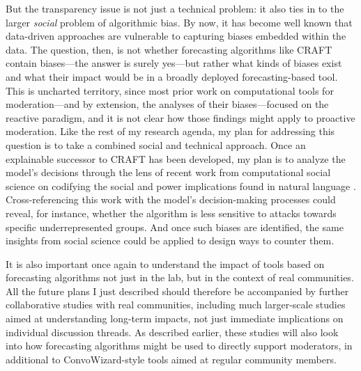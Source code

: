 \documentclass[11pt,letterpaper]{article}
\begin{document}
But the transparency issue is not just a technical problem: it also ties in to the larger \emph{social} problem of algorithmic bias.
By now, it has become well known that data-driven approaches are vulnerable to capturing biases embedded within the data.
The question, then, is not whether forecasting algorithms like CRAFT contain biases---the answer is surely yes---but rather what kinds of biases exist and what their impact would be in a broadly deployed forecasting-based tool.
This is uncharted territory, since most prior work on computational tools for moderation---and by extension, the analyses of their biases---focused on the reactive paradigm, and it is not clear how those findings might apply to proactive moderation.
Like the rest of my research agenda, my plan for addressing this question is to take a combined social and technical approach.
Once an explainable successor to CRAFT has been developed, my plan is to analyze the model's decisions through the lens of recent work from computational social science on codifying the social and power implications found in natural language \cite{sap_social_2020}.
Cross-referencing this work with the model's decision-making processes could reveal, for instance, whether the algorithm is less sensitive to attacks towards specific underrepresented groups.
And once such biases are identified, the same insights from social science could be applied to design ways to counter them.

It is also important once again to understand the impact of tools based on forecasting algorithms not just in the lab, but in the context of real communities.
All the future plans I just described should therefore be accompanied by further collaborative studies with real communities, including much larger-scale studies aimed at understanding long-term impacts, not just immediate implications on individual discussion threads.
As described earlier, these studies will also look into how forecasting algorithms might be used to directly support moderators, in additional to ConvoWizard-style tools aimed at regular community members.
\end{document}
